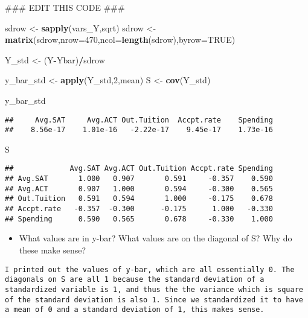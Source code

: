 \documentclass[]{article}
\newenvironment{Shaded}{\begin{snugshade}}{\end{snugshade}}
\newcommand{\KeywordTok}[1]{\textcolor[rgb]{0.13,0.29,0.53}{\textbf{#1}}}
\newcommand{\DataTypeTok}[1]{\textcolor[rgb]{0.13,0.29,0.53}{#1}}
\newcommand{\DecValTok}[1]{\textcolor[rgb]{0.00,0.00,0.81}{#1}}
\newcommand{\StringTok}[1]{\textcolor[rgb]{0.31,0.60,0.02}{#1}}
\newcommand{\OtherTok}[1]{\textcolor[rgb]{0.56,0.35,0.01}{#1}}
\newcommand{\OperatorTok}[1]{\textcolor[rgb]{0.81,0.36,0.00}{\textbf{#1}}}
\newcommand{\AlertTok}[1]{\textcolor[rgb]{0.94,0.16,0.16}{#1}}
\newcommand{\NormalTok}[1]{#1}
\providecommand{\tightlist}{%
  \setlength{\itemsep}{0pt}\setlength{\parskip}{0pt}}
\begin{document}
\begin{Shaded}
\begin{Highlighting}[]
\NormalTok{### EDIT THIS CODE }\AlertTok{###}

\NormalTok{sdrow <-}\StringTok{ }\KeywordTok{sapply}\NormalTok{(vars_Y,sqrt)}
\NormalTok{sdrow <-}\StringTok{ }\KeywordTok{matrix}\NormalTok{(sdrow,}\DataTypeTok{nrow=}\DecValTok{470}\NormalTok{,}\DataTypeTok{ncol=}\KeywordTok{length}\NormalTok{(sdrow),}\DataTypeTok{byrow=}\OtherTok{TRUE}\NormalTok{)}

\NormalTok{Y_std <-}\StringTok{ }\NormalTok{(Y}\OperatorTok{-}\NormalTok{Ybar)}\OperatorTok{/}\NormalTok{sdrow}

\NormalTok{y_bar_std <-}\StringTok{  }\KeywordTok{apply}\NormalTok{(Y_std,}\DecValTok{2}\NormalTok{,mean)}
\NormalTok{S <-}\StringTok{ }\KeywordTok{cov}\NormalTok{(Y_std)}

\NormalTok{y_bar_std}
\end{Highlighting}
\end{Shaded}

\begin{verbatim}
##     Avg.SAT     Avg.ACT Out.Tuition  Accpt.rate    Spending 
##    8.56e-17    1.01e-16   -2.22e-17    9.45e-17    1.73e-16
\end{verbatim}

\begin{Shaded}
\begin{Highlighting}[]
\NormalTok{S}
\end{Highlighting}
\end{Shaded}

\begin{verbatim}
##             Avg.SAT Avg.ACT Out.Tuition Accpt.rate Spending
## Avg.SAT       1.000   0.907       0.591     -0.357    0.590
## Avg.ACT       0.907   1.000       0.594     -0.300    0.565
## Out.Tuition   0.591   0.594       1.000     -0.175    0.678
## Accpt.rate   -0.357  -0.300      -0.175      1.000   -0.330
## Spending      0.590   0.565       0.678     -0.330    1.000
\end{verbatim}

\begin{itemize}
\tightlist
\item
  What values are in y-bar? What values are on the diagonal of S? Why do
  these make sense?
\end{itemize}

\begin{verbatim}
I printed out the values of y-bar, which are all essentially 0. The diagonals on S are all 1 because the standard deviation of a standardized variable is 1, and thus the the variance which is square of the standard deviation is also 1. Since we standardized it to have a mean of 0 and a standard deviation of 1, this makes sense.
\end{verbatim}
\end{document}
